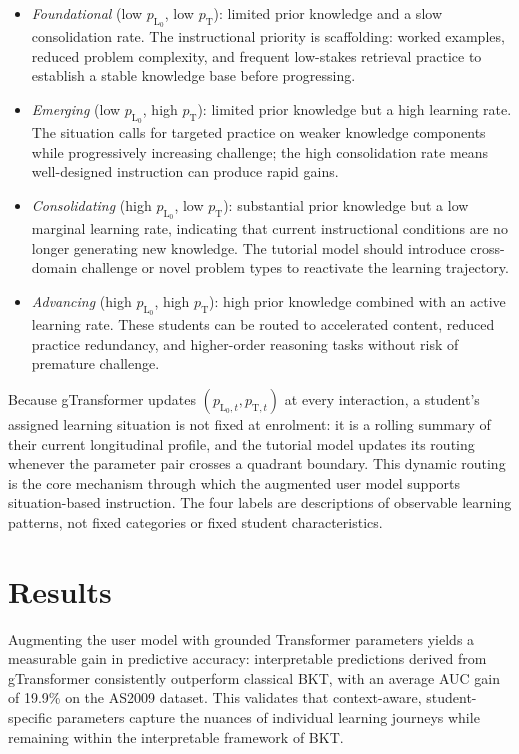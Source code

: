 \documentclass[runningheads]{llncs}
\begin{document}
\begin{itemize}
    \item \textit{Foundational} (low $p_{\text{L}_0}$, low $p_{\text{T}}$): limited prior knowledge and a slow consolidation rate. The instructional priority is scaffolding: worked examples, reduced problem complexity, and frequent low-stakes retrieval practice to establish a stable knowledge base before progressing.
    \item \textit{Emerging} (low $p_{\text{L}_0}$, high $p_{\text{T}}$): limited prior knowledge but a high learning rate. The situation calls for targeted practice on weaker knowledge components while progressively increasing challenge; the high consolidation rate means well-designed instruction can produce rapid gains.
    \item \textit{Consolidating} (high $p_{\text{L}_0}$, low $p_{\text{T}}$): substantial prior knowledge but a low marginal learning rate, indicating that current instructional conditions are no longer generating new knowledge. The tutorial model should introduce cross-domain challenge or novel problem types to reactivate the learning trajectory.
    \item \textit{Advancing} (high $p_{\text{L}_0}$, high $p_{\text{T}}$): high prior knowledge combined with an active learning rate. These students can be routed to accelerated content, reduced practice redundancy, and higher-order reasoning tasks without risk of premature challenge.
\end{itemize}

Because gTransformer updates $(p_{\text{L}_0,t}, p_{\text{T},t})$ at every interaction, a student's assigned learning situation is not fixed at enrolment: it is a rolling summary of their current longitudinal profile, and the tutorial model updates its routing whenever the parameter pair crosses a quadrant boundary. This dynamic routing is the core mechanism through which the augmented user model supports situation-based instruction. The four labels are descriptions of observable learning patterns, not fixed categories or fixed student characteristics.

%
\section{Results}

Augmenting the user model with grounded Transformer parameters yields a measurable gain in predictive accuracy: interpretable predictions derived from gTransformer consistently outperform classical BKT, with an average AUC gain of 19.9\% on the AS2009 dataset. This validates that context-aware, student-specific parameters capture the nuances of individual learning journeys while remaining within the interpretable framework of BKT.
\end{document}
